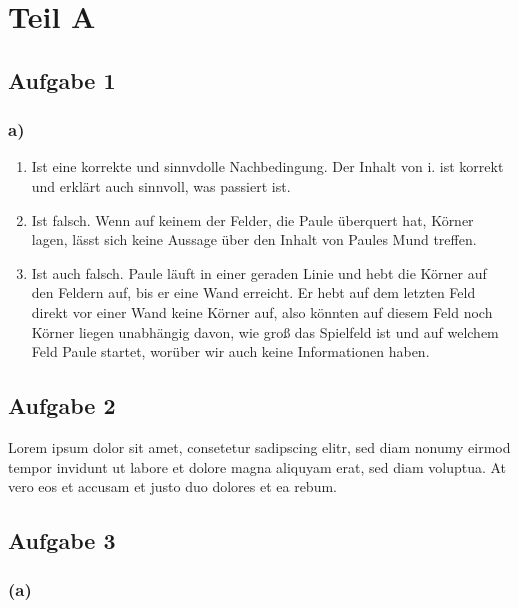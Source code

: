 
\section*{Teil A}
\subsection*{Aufgabe 1}
\subsubsection*{a)}

\begin{enumerate}[label=\roman*.]
	\item  Ist eine korrekte und sinnvdolle Nachbedingung. Der Inhalt von i. ist korrekt und erklärt auch sinnvoll, was passiert ist.
	\item  Ist falsch. Wenn auf keinem der Felder, die Paule überquert hat, Körner lagen, lässt sich keine Aussage über den Inhalt von Paules Mund treffen.
	\item  Ist auch falsch. Paule läuft in einer geraden Linie und hebt die Körner auf den Feldern auf, bis er eine Wand erreicht. Er hebt auf dem letzten Feld direkt vor einer Wand keine Körner auf, also könnten auf diesem Feld noch Körner liegen unabhängig davon, wie groß das Spielfeld ist und auf welchem Feld Paule startet, worüber wir auch keine Informationen haben.
\end{enumerate}

\subsection*{Aufgabe 2}
\begin{shadedbox}
	Lorem ipsum dolor sit amet, consetetur sadipscing elitr, sed diam nonumy eirmod tempor invidunt ut labore et dolore
	magna aliquyam erat, sed diam voluptua. At vero eos et accusam et justo duo dolores et ea rebum.
\end{shadedbox}


\subsection*{Aufgabe 3}
\subsubsection*{(a)}

